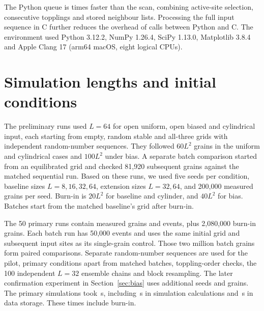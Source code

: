 \begin{table}[htbp]
\centering\small

\caption{Stabilization times for the same $L=16$ calculation:  predetermined inputs from an all-three grid, giving  elementary topplings. Each implementation first completes one untimed run. Each of five timing samples then repeats complete calculations for at least 0.2\,s, resetting the grid each time. Reported times are per calculation. All methods give identical $S,A,D,\ell$ and final grids. Compilation (\,s) and initial loading/warm-up (\,s) are timed separately. Ranges are minimum to maximum. Speed ratios use the Python scan median. Times exclude generating input sites and reading or writing data.}
\label{tab:performance}
\end{table}

The Python queue is  times faster than the scan, combining active-site selection, consecutive topplings and stored neighbour lists. Processing the full input sequence in C further reduces the overhead of calls between Python and C. The environment used Python 3.12.2, NumPy 1.26.4, SciPy 1.13.0, Matplotlib 3.8.4 and Apple Clang 17 (arm64 macOS, eight logical CPUs).

\section{Simulation lengths and initial conditions}\label{sec:design}
The preliminary runs used $L=64$ for open uniform, open biased and cylindrical input, each starting from empty, random stable and all-three grids with independent random-number sequences. They followed $60L^2$ grains in the uniform and cylindrical cases and $100L^2$ under bias. A separate batch comparison started from an equilibrated grid and checked 81,920 subsequent grains against the matched sequential run. Based on these runs, we used five seeds per condition, baseline sizes $L=8,16,32,64$, extension sizes $L=32,64$, and 200,000 measured grains per seed. Burn-in is $20L^2$ for baseline and cylinder, and $40L^2$ for bias. Batches start from the matched baseline's grid after burn-in.

The 50 primary runs contain  measured grains and  events, plus 2,080,000 burn-in grains. Each batch run has 50,000 events and uses the same initial grid and subsequent input sites as its single-grain control. Those two million batch grains form paired comparisons. Separate random-number sequences are used for the pilot, primary conditions apart from matched batches, toppling-order checks, the 100 independent $L=32$ ensemble chains and block resampling. The later confirmation experiment in Section~\ref{sec:bias} uses additional seeds and grains. The primary simulations took \,s, including \,s in simulation calculations and \,s in data storage. These times include burn-in.

